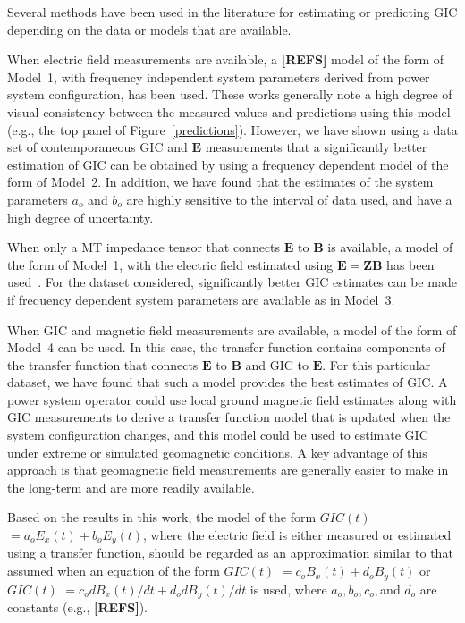 \documentclass[draft,linenumbers]{agujournal2018}
\begin{document}
Several methods have been used in the literature for estimating or predicting GIC depending on the data or models that are available.

When electric field measurements are available, a  {\color{red} \textbf{[REFS]}} model of the form of Model~1, with frequency independent system parameters derived from power system configuration, has been used. These works generally note a high degree of visual consistency between the measured values and predictions using this model (e.g., the top panel of Figure~\ref{predictions}). However, we have shown using a data set of contemporaneous GIC and $\mathbf{E}$ measurements that a significantly better estimation of GIC can be obtained by using a frequency dependent model of the form of Model~2. In addition, we have found that the estimates of the system parameters $a_o$ and $b_o$ are highly sensitive to the interval of data used, and have a high degree of uncertainty.

When only a MT impedance tensor that connects $\mathbf{E}$ to $\mathbf{B}$ is available, a model of the form of Model~1, with the electric field estimated using $\mathbf{E}=\mathbf{Z}\mathbf{B}$ has been used~\citep{Weigel2017,Bonner2017,Kelbert2017}. For the dataset considered, significantly better GIC estimates can be made if frequency dependent system parameters are available as in Model~3. 

When GIC and magnetic field measurements are available, a model of the form of Model~4 can be used. In this case, the transfer function contains components of the transfer function that connects $\mathbf{E}$ to $\mathbf{B}$ and GIC to $\mathbf{E}$. For this particular dataset, we have found that such a model provides the best estimates of GIC. A power system operator could use local ground magnetic field estimates along with GIC measurements to derive a transfer function model that is updated when the system configuration changes, and this model could be used to estimate GIC under extreme or simulated geomagnetic conditions. A key advantage of this approach is that geomagnetic field measurements are generally easier to make in the long-term and are more readily available.

Based on the results in this work, the model of the form $GIC(t)$ $=a_oE_x(t)+b_oE_y(t)$, where the electric field is either measured or estimated using a transfer function, should be regarded as an approximation similar to that assumed when an equation of the form $GIC(t)$ $=c_oB_x(t)+d_oB_y(t)$ or $GIC(t)$ $=c_odB_x(t)/dt+d_odB_y(t)/dt$ is used, where $a_o, b_o, c_o, $and $d_o$ are constants (e.g., {\color{red} \textbf{[REFS]}}).
\end{document}
